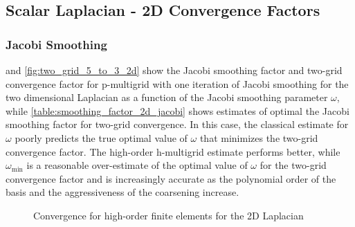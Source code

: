 \documentclass[review]{siamart190516}
\begin{document}
\subsection{Scalar Laplacian - 2D Convergence Factors}\label{sec:2dresults}

\subsubsection{Jacobi Smoothing}

 and \cref{fig:two_grid_5_to_3_2d} show the Jacobi smoothing factor and two-grid convergence factor for p-multigrid with one iteration of Jacobi smoothing for the two dimensional Laplacian as a function of the Jacobi smoothing parameter $\omega$, while \cref{table:smoothing_factor_2d_jacobi} shows estimates of optimal the Jacobi smoothing factor for two-grid convergence.
In this case, the classical estimate for $\omega$ poorly predicts the true optimal value of $\omega$ that minimizes the two-grid convergence factor.
The high-order h-multigrid estimate performs better, while $\omega_{\min}$ is a reasonable over-estimate of the optimal value of $\omega$ for the two-grid convergence factor and is increasingly accurate as the polynomial order of the basis and the aggressiveness of the coarsening increase.

\begin{figure}[!tbp]
  \centering
  \hfill
  \caption{Convergence for high-order finite elements for the 2D Laplacian}
\end{figure}
\end{document}
